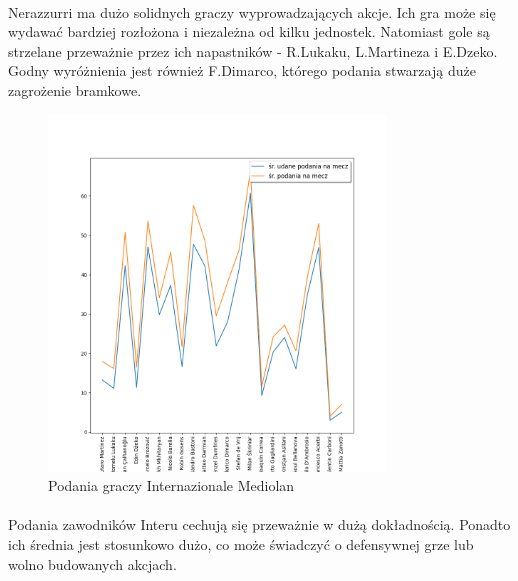 \documentclass[12pt, letterpaper]{article}
\begin{document}
\paragraph{} Nerazzurri ma dużo solidnych graczy wyprowadzających akcje. Ich gra może się wydawać bardziej rozłożona i niezależna od kilku jednostek. Natomiast gole są strzelane przeważnie przez ich napastników - R.Lukaku, L.Martineza i E.Dzeko. Godny wyróżnienia jest również F.Dimarco, którego podania stwarzają duże zagrożenie bramkowe.
\pagebreak
\begin{figure}[ht]
    \centering
    \includegraphics[width=0.8\textwidth]{images/Inter_passes.png}
    \caption{Podania graczy Internazionale Mediolan}
    \label{fig:enter-label}
\end{figure}
\paragraph{} Podania zawodników Interu cechują się przeważnie w dużą dokładnością. Ponadto ich średnia jest stosunkowo dużo, co może świadczyć o defensywnej grze lub wolno budowanych akcjach.
\pagebreak
\end{document}
